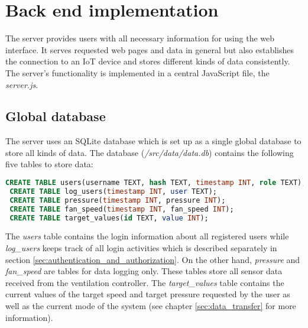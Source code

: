 \chapter{Back end implementation}
\label{ch:back_end_implementation}

The server provides users with all necessary information for using the web interface. It serves requested web pages and data in general but also establishes the connection to an IoT device and stores different kinds of data consistently. The server's functionality is implemented in a central JavaScript file, the \textit{server.js}.





\section{Global database}
\label{sec:global_database}

The server uses an SQLite database which is set up as a single global database to store all kinds of data.  The database (\textit{/src/data/data.db}) contains the following five tables to store data:

\begin{lstlisting}[language = SQL, numbers = none]
 CREATE TABLE users(username TEXT, hash TEXT, timestamp INT, role TEXT);
 CREATE TABLE log_users(timestamp INT, user TEXT);
 CREATE TABLE pressure(timestamp INT, pressure INT);
 CREATE TABLE fan_speed(timestamp INT, fan_speed INT);
 CREATE TABLE target_values(id TEXT, value INT);
\end{lstlisting}

The \textit{users} table contains the login information about all registered users while \textit{log\_users} keeps track of all login activities which is described separately in section \ref{sec:authentication_and_authorization}. On the other hand, \textit{pressure} and \textit{fan\_speed} are tables for data logging only. These tables store all sensor data received from the ventilation controller. The \textit{target\_values} table contains the current values of the target speed and target pressure requested by the user as well as the current mode of the system (see chapter \ref{sec:data_transfer} for more information).




